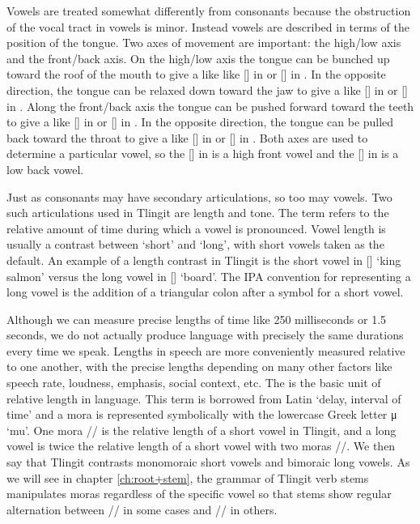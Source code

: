 Vowels are treated somewhat differently from consonants because the obstruction of the vocal tract in vowels is minor. Instead vowels are described in terms of the position of the tongue. Two axes of movement are important: the high/low axis and the front/back axis. On the high/low axis the tongue can be bunched up toward the roof of the mouth to give a  like like [] in  or [] in . In the opposite direction, the tongue can be relaxed down toward the jaw to give a  like [] in  or [] in . Along the front/back axis the tongue can be pushed forward toward the teeth to give a  like [] in  or [] in . In the opposite direction, the tongue can be pulled back toward the throat to give a  like [] in  or [] in . Both axes are used to determine a particular vowel, so the [] in  is a high front vowel and the [] in  is a low back vowel.

Just as consonants may have secondary articulations, so too may vowels. Two such articulations used in Tlingit are length and tone. The term  refers to the relative amount of time during which a vowel is pronounced. Vowel length is usually a contrast between ‘short’ and ‘long’, with short vowels taken as the default. An example of a length contrast in Tlingit is the short vowel in  [] ‘king salmon’ versus the long vowel in  [] ‘board’. The IPA convention for representing a long vowel is the addition of a triangular colon  after a symbol for a short vowel.

Although we can measure precise lengths of time like 250 milliseconds or 1.5 seconds, we do not actually produce language with precisely the same durations every time we speak. Lengths in speech are more conveniently measured relative to one another, with the precise lengths depending on many other factors like speech rate, loudness, emphasis, social context, etc. The  is the basic unit of relative length in language. This term is borrowed from Latin  ‘delay, interval of time’ and a mora is represented symbolically with the lowercase Greek letter μ ‘mu’. One mora // is the relative length of a short vowel in Tlingit, and a long vowel is twice the relative length of a short vowel with two moras //. We then say that Tlingit contrasts monomoraic short vowels and bimoraic long vowels. As we will see in chapter \ref{ch:root+stem}, the grammar of Tlingit verb stems manipulates moras regardless of the specific vowel so that stems show regular alternation between // in some cases and // in others.

